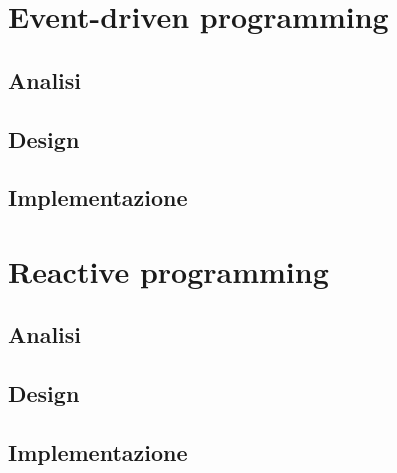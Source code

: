 \documentclass[12pt,a4paper,oneside]{article}
\begin{document}
	\section{Event-driven programming}
	\subsection{Analisi}
	\subsection{Design}
	\subsection{Implementazione}
	
	\section{Reactive programming}
	\subsection{Analisi}
	\subsection{Design}
	\subsection{Implementazione}
\end{document}
